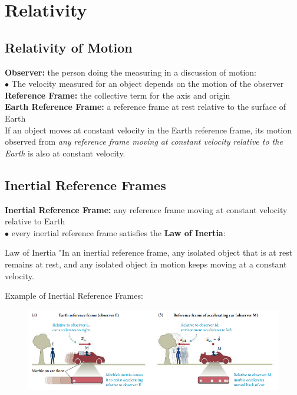 \section{Relativity}

    \subsection{Relativity of Motion}

        \textbf{Observer:} the person doing the measuring in a discussion of motion: \\
        $\bullet$ The velocity measured for an object depends on the motion of the observer \\
        \textbf{Reference Frame:} the collective term for the axis and origin \\
        \textbf{Earth Reference Frame:} a reference frame at rest relative to the surface of Earth \\

        If an object moves at constant velocity in the Earth reference frame, its motion observed from \textit{any reference frame moving at constant velocity relative to the Earth} is also at constant velocity.

    \subsection{Inertial Reference Frames}

        \textbf{Inertial Reference Frame:} any reference frame moving at constant velocity relative to Earth \\
        $\bullet$ every inertial reference frame satisfies the \textbf{Law of Inertia}:

        \begin{tbhtheorem}[colback=red!10,colframe=red]{Law of Inertia}
            "In an inertial reference frame, any isolated object that is at rest remains at rest, and any isolated object in motion keeps moving at a constant velocity.
        \end{tbhtheorem}

        Example of Inertial Reference Frames:

        \begin{figure}[hbt!]
            \centering
            \includegraphics[]{Resources/Reference_Frames}
        \end{figure}

